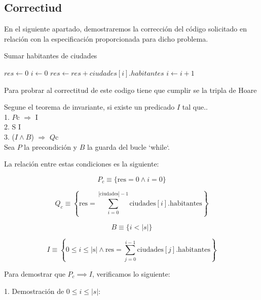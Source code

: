 \documentclass[10pt,a4paper]{article}
\begin{document}
\subsection{Correctiud}
En el siguiente apartado, demostraremos la corrección del código solicitado  en relación con la especificación proporcionada para dicho problema.  


\begin{algorithm}
\caption{Sumar habitantes de ciudades}
\begin{algorithmic}[1]
\State $res \gets 0$
\State $i \gets 0$
    \State $res \gets res + ciudades[i].habitantes$
    \State $i \gets i + 1$
\EndWhile
\end{algorithmic}
\end{algorithm}

Para probrar al correctitud de este codigo tiene que cumplir se la tripla de Hoare 

Segune el teorema de invariante, si existe un predicado \ensuremath{I} tal que.. \\

1. \ensuremath{P}c \ensuremath{\Longrightarrow} I \\
2.  {S} {I} \\
3. ($I \wedge  B$) \ensuremath{\Longrightarrow}  \ensuremath{Q}c \\ 

Sea \( P \) la precondición y \( B \) la guarda del bucle `while`.

La relación entre estas condiciones es la siguiente:

\[
P_c \equiv \{ \text{res} = 0 \land i = 0 \}
\]

\[
Q_c \equiv \left\{ \text{res} = \sum_{i=0}^{|\text{ciudades}|-1} \text{ciudades}[i].\text{habitantes} \right\}
\]

\[
B \equiv \{ i < |s| \}
\]

\[
I \equiv \left\{ 0 \leq i \leq |\text{s}| \land \text{res} = \sum_{j=0}^{i-1} \text{ciudades}[j].\text{habitantes} \right\}
\]



Para demostrar que \( P_c \implies I \), verificamos lo siguiente:

1. Demostración de \( 0 \leq i \leq |s| \):
\end{document}
